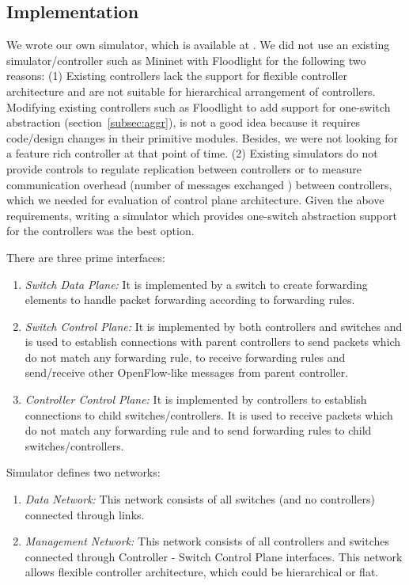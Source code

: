 \documentclass[10pt, twocolumn]{article}
\begin{document}
\subsection{Implementation}
\label{sec:implementation}
We wrote our own simulator, which is available at \cite{simulator}. We did not use an existing simulator/controller such as Mininet\cite{mininet} with Floodlight\cite{floodlight} for the following two reasons: (1) Existing controllers lack the support for flexible controller architecture and are not suitable for hierarchical arrangement of controllers. Modifying existing controllers such as Floodlight to add support for one-switch abstraction (section~\ref{subsec:aggr}), is not a good idea because it requires code/design changes in their primitive modules. Besides, we were not looking for a feature rich controller at that point of time. (2) Existing simulators do not provide controls to regulate replication between controllers or to measure communication overhead (number of messages exchanged ) between controllers, which we needed for evaluation of control plane architecture. Given the above requirements, writing a simulator which provides one-switch abstraction support for the controllers was the best option.

There are three prime interfaces:
\begin{enumerate}
    \item {\it Switch Data Plane:} It is implemented by a switch to create forwarding elements to handle packet forwarding according to forwarding rules.
    \item {\it Switch Control Plane:} It is implemented by both controllers and switches and is used to establish connections with parent controllers to send packets which do not match any forwarding rule, to receive forwarding rules and send/receive other OpenFlow-like messages from parent controller.
    \item {\it Controller Control Plane:} It is implemented by controllers to establish connections to child switches/controllers. It is used to receive packets which do not match any forwarding rule and to send forwarding rules to child switches/controllers.
\end{enumerate}
Simulator defines two networks:
\begin{enumerate}
    \item {\it Data Network:} This network consists of all switches (and no controllers) connected through links.
    \item {\it Management Network:} This network consists of all controllers and switches connected through Controller - Switch Control Plane interfaces. This network allows flexible controller architecture, which could be hierarchical or flat.
\end{enumerate}
\end{document}
